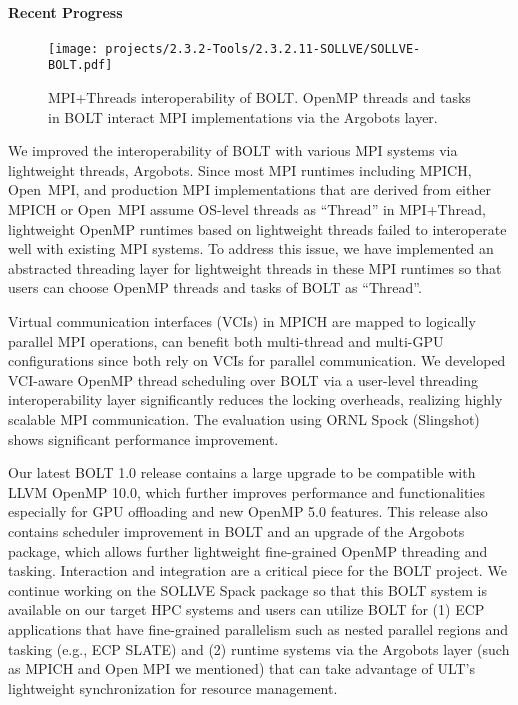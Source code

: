 \paragraph{Recent Progress}

\begin{figure}[t]
  \centering
  \texttt{[image: projects/2.3.2-Tools/2.3.2.11-SOLLVE/SOLLVE-BOLT.pdf]}

  \caption{\label{fig:sollve-bolt} MPI+Threads interoperability of
  BOLT.  OpenMP threads and tasks in BOLT interact MPI implementations
  via the Argobots layer.}
\end{figure}

We improved the interoperability of BOLT with various MPI systems via
lightweight threads, Argobots.  Since most MPI runtimes including
MPICH, Open~MPI, and production MPI implementations that are derived
from either MPICH or Open~MPI assume OS-level threads as ``Thread'' in
MPI+Thread, lightweight OpenMP runtimes based on lightweight threads
failed to interoperate well with existing MPI systems.  To address
this issue, we have implemented an abstracted threading layer for
lightweight threads in these MPI runtimes so that users can choose
OpenMP threads and tasks of BOLT as ``Thread''.

Virtual communication interfaces (VCIs) in MPICH are mapped to logically parallel MPI operations, can benefit both multi-thread and multi-GPU configurations since both rely on VCIs for parallel communication. We developed VCI-aware OpenMP thread scheduling over BOLT via a user-level threading interoperability layer significantly reduces the locking overheads, realizing highly scalable MPI communication. The evaluation using ORNL Spock (Slingshot) shows significant performance improvement.

Our latest BOLT 1.0 release contains a large upgrade to be compatible
with LLVM OpenMP 10.0, which further improves performance and
functionalities especially for GPU offloading and new OpenMP 5.0
features.  This release also contains scheduler improvement in BOLT
and an upgrade of the Argobots package, which allows further
lightweight fine-grained OpenMP threading and tasking.  Interaction
and integration are a critical piece for the BOLT project.  We
continue working on the SOLLVE Spack package so that this BOLT system
is available on our target HPC systems and users can utilize BOLT for
(1) ECP applications that have fine-grained parallelism such as nested
parallel regions and tasking (e.g., ECP SLATE) and (2) runtime systems
via the Argobots layer (such as MPICH and Open MPI we mentioned) that
can take advantage of ULT's lightweight synchronization for resource
management.

